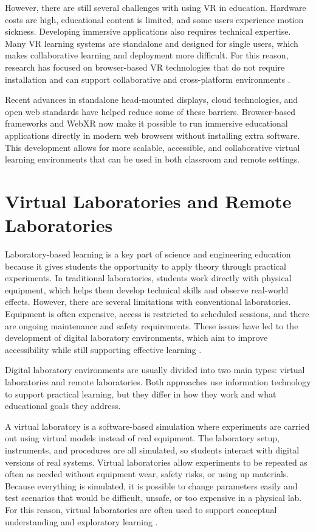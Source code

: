 However, there are still several challenges with using VR in education. Hardware costs are high, educational content is limited, and some users experience motion sickness. Developing immersive applications also requires technical expertise. Many VR learning systems are standalone and designed for single users, which makes collaborative learning and deployment more difficult. For this reason, research has focused on browser-based VR technologies that do not require installation and can support collaborative and cross-platform environments \cite{sakr2024vrreview}.

Recent advances in standalone head-mounted displays, cloud technologies, and open web standards have helped reduce some of these barriers. Browser-based frameworks and WebXR now make it possible to run immersive educational applications directly in modern web browsers without installing extra software. This development allows for more scalable, accessible, and collaborative virtual learning environments that can be used in both classroom and remote settings.



\section{Virtual Laboratories and Remote Laboratories}

Laboratory-based learning is a key part of science and engineering education because it gives students the opportunity to apply theory through practical experiments. In traditional laboratories, students work directly with physical equipment, which helps them develop technical skills and observe real-world effects. However, there are several limitations with conventional laboratories. Equipment is often expensive, access is restricted to scheduled sessions, and there are ongoing maintenance and safety requirements. These issues have led to the development of digital laboratory environments, which aim to improve accessibility while still supporting effective learning \cite{ma2011virtual}.

Digital laboratory environments are usually divided into two main types: virtual laboratories and remote laboratories. Both approaches use information technology to support practical learning, but they differ in how they work and what educational goals they address.

A virtual laboratory is a software-based simulation where experiments are carried out using virtual models instead of real equipment. The laboratory setup, instruments, and procedures are all simulated, so students interact with digital versions of real systems. Virtual laboratories allow experiments to be repeated as often as needed without equipment wear, safety risks, or using up materials. Because everything is simulated, it is possible to change parameters easily and test scenarios that would be difficult, unsafe, or too expensive in a physical lab. For this reason, virtual laboratories are often used to support conceptual understanding and exploratory learning \cite{potkonjak2016virtual}.

